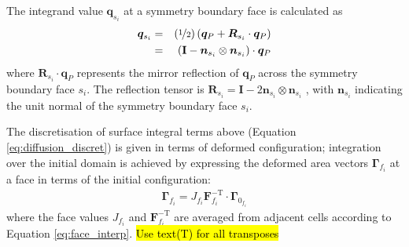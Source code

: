 \documentclass[sn-mathphys,Numbered]{sn-jnl}%
\newcommand{\bb}{\boldsymbol}
\begin{document}
The integrand value $\bb{q}_{s_i}$  at a symmetry boundary face is calculated as
\begin{eqnarray} \label{eq:symm}
	\bb{q}_{s_i} 
		&=& \left( \nicefrac{1}{2} \right) \left (\bb{q}_P + \bb{R}_{s_i} \cdot \bb{q}_{P} \right) \notag \\
		&=& \left (\textbf{I} - \bb{n}_{s_i} \otimes \bb{n}_{s_i} \right) \cdot \bb{q}_P
\end{eqnarray}
where $\bb{R}_{s_i} \cdot \bb{q}_{P}$ represents the mirror reflection of $\bb{q}_P$ across the symmetry boundary face $s_i$.
The reflection tensor is $\bb{R}_{s_i} = \textbf{I} - 2 \bb{n}_{s_i} \otimes \bb{n}_{s_i}$ \citep{Demirdzic2022}, with $\bb{n}_{s_i}$ indicating the unit normal of the symmetry boundary face $s_i$.

The discretisation of surface integral terms above (Equation \ref{eq:diffusion_discret}) is given in terms of deformed configuration;
integration over the initial domain is achieved by expressing the deformed area vectors $\bb{\Gamma}_{f_i}$ at a face in terms of the initial configuration:
\begin{eqnarray} 
	\bb{\Gamma}_{f_i} = J_{f_i} \bb{F}_{f_i}^{-\text{T}} \cdot \bb{\Gamma}_{0_{f_i}}
\end{eqnarray} 
where the face values $J_{f_i}$ and $\bb{F}_{f_i}^{-\text{T}}$ are averaged from adjacent cells according to Equation \ref{eq:face_interp}.
\hl{Use text(T) for all transposes}
\end{document}
